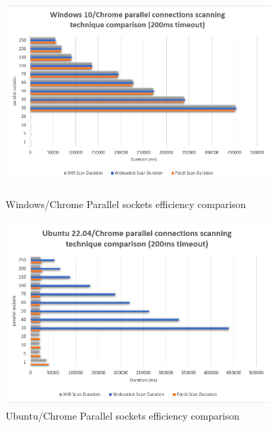 \begin{figure}[ht]
\begin{adjustwidth}{-3cm}{-1cm}
\centering
\begin{minipage}{.45\textwidth}
  \centering
\includegraphics[width=10cm, height=7cm, keepaspectratio]{port_scanning_techniques/img/windows_chrome_scan_technique_comparison.png}
    \caption{Windows/Chrome Parallel sockets efficiency comparison}
    \label{fig:appendix-windows_chrome_n_sockets}
\end{minipage}
\hspace{3cm} %
\begin{minipage}{.45\textwidth}
\includegraphics[width=10cm, height=7cm, keepaspectratio]{port_scanning_techniques/img/ubuntu_chrome_scan_technique_comparison.png}
    \caption{Ubuntu/Chrome Parallel sockets efficiency comparison}
    \label{fig:appendix-ubuntu_chrome_n_sockets}
\end{minipage}
\end{adjustwidth}
\end{figure}

